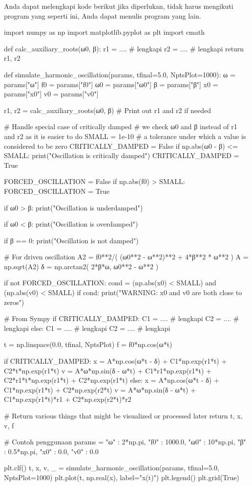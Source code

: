 Anda dapat melengkapi kode berikut jika diperlukan, tidak harus mengikuti program
yang seperti ini, Anda dapat menulis program yang lain.
\begin{pythoncode}
import numpy as np
import matplotlib.pyplot as plt
import cmath

def calc_auxiliary_roots(ω0, β):
    r1 = .... # lengkapi
    r2 = .... # lengkapi
    return r1, r2

def simulate_harmonic_oscillation(params, tfinal=5.0, NptsPlot=1000):
    ω = params["ω"]
    f0 = params["f0"]
    ω0 = params["ω0"]
    β = params["β"]
    x0 = params["x0"]
    v0 = params["v0"]

    r1, r2 = calc_auxiliary_roots(ω0, β)
    # Print out r1 and r2 if needed

    # Handle special case of critically damped
    # we check ω0 and β instead of r1 and r2 as it is easier to do
    SMALL = 1e-10 # a tolerance under which a value is considered to be zero
    CRITICALLY_DAMPED = False
    if np.abs(ω0 - β) <= SMALL:
        print("Oscillation is critically damped")
        CRITICALLY_DAMPED = True

    FORCED_OSCILLATION = False
    if np.abs(f0) > SMALL:
        FORCED_OSCILLATION = True

    if ω0 > β:
        print("Oscillation is underdamped")

    if ω0 < β:
        print("Oscillation is overdamped")

    if β == 0:
        print("Oscillation is not damped")

    # For driven oscillation
    A2 = f0**2/( (ω0**2 - ω**2)**2 + 4*β**2 * ω**2 )
    A = np.sqrt(A2)
    δ = np.arctan2( 2*β*ω, ω0**2 - ω**2 )

    if not FORCED_OSCILLATION:
        cond = (np.abs(x0) < SMALL) and (np.abs(v0) < SMALL)
        if cond:
            print("WARNING: x0 and v0 are both close to zeros")

    # From Sympy
    if CRITICALLY_DAMPED:
        C1 = .... # lengkapi
        C2 = .... # lengkapi
    else:
        C1 = .... # lengkapi
        C2 = .... # lengkapi

    t = np.linspace(0.0, tfinal, NptsPlot)
    f = f0*np.cos(ω*t)

    if CRITICALLY_DAMPED:
        x = A*np.cos(ω*t - δ) + C1*np.exp(r1*t) + C2*t*np.exp(r1*t)
        v = A*ω*np.sin(δ - ω*t) + C1*r1*np.exp(r1*t) + C2*r1*t*np.exp(r1*t) + C2*np.exp(r1*t)
    else:
        x = A*np.cos(ω*t - δ) + C1*np.exp(r1*t) + C2*np.exp(r2*t)
        v = A*ω*np.sin(δ - ω*t) + C1*np.exp(r1*t)*r1 + C2*np.exp(r2*t)*r2

    # Return various things that might be visualized or processed later
    return t, x, v, f

# Contoh penggunaan
params = {
    "ω" : 2*np.pi,
    "f0" : 1000.0,
    "ω0" : 10*np.pi,
    "β" : 0.5*np.pi,
    "x0" : 0.0,
    "v0" : 0.0
}

plt.clf()
t, x, v, _ = simulate_harmonic_oscillation(params, tfinal=5.0, NptsPlot=1000)
plt.plot(t, np.real(x), label="x(t)")
plt.legend()
plt.grid(True)
\end{pythoncode}

